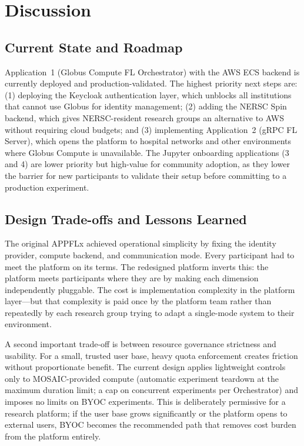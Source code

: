 \documentclass[conference]{IEEEtran}
\begin{document}
\section{Discussion}

\subsection{Current State and Roadmap}

Application~1 (Globus Compute FL Orchestrator) with the AWS ECS
backend is currently deployed and production-validated. The highest
priority next steps are: (1) deploying the Keycloak authentication
layer, which unblocks all institutions that cannot use Globus for
identity management; (2) adding the NERSC Spin backend, which gives
NERSC-resident research groups an alternative to AWS without requiring
cloud budgets; and (3) implementing Application~2 (gRPC FL Server),
which opens the platform to hospital networks and other environments
where Globus Compute is unavailable. The Jupyter onboarding
applications (3 and 4) are lower priority but high-value for
community adoption, as they lower the barrier for new participants to
validate their setup before committing to a production experiment.

\subsection{Design Trade-offs and Lessons Learned}

The original APPFLx achieved operational simplicity by fixing the
identity provider, compute backend, and communication mode. Every
participant had to meet the platform on its terms. The redesigned
platform inverts this: the platform meets participants where they are
by making each dimension independently pluggable. The cost is
implementation complexity in the platform layer---but that complexity
is paid once by the platform team rather than repeatedly by each
research group trying to adapt a single-mode system to their
environment.

A second important trade-off is between resource governance strictness
and usability. For a small, trusted user base, heavy quota enforcement
creates friction without proportionate benefit. The current design
applies lightweight controls only to MOSAIC-provided compute
(automatic experiment teardown at the maximum duration limit; a cap on
concurrent experiments per Orchestrator) and imposes no limits on BYOC
experiments. This is deliberately permissive for a research platform;
if the user base grows significantly or the platform opens to external
users, BYOC becomes the recommended path that removes cost burden from
the platform entirely.
\end{document}
